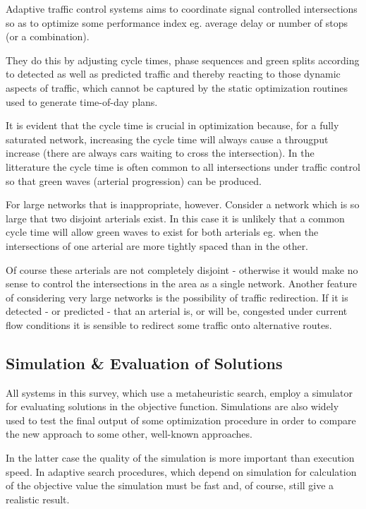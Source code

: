 \label{adaptive_cooperation}
Adaptive traffic control systems aims to coordinate signal controlled intersections so as to optimize some performance index eg. average delay or number of stops (or a combination).

They do this by adjusting cycle times, phase sequences and green splits according to detected as well as predicted traffic and thereby reacting to those dynamic aspects of traffic, which cannot be captured by the static optimization routines used to generate time-of-day plans.

It is evident that the cycle time is crucial in optimization because, for a fully saturated network, increasing the cycle time will always cause a througput increase (there are always cars waiting to cross the intersection). In the litterature the cycle time is often common to all intersections under traffic control so that green waves (arterial progression) can be produced. 

For large networks that is inappropriate, however. Consider a network which is so large that two disjoint arterials exist. In this case it is unlikely that a common cycle time will allow green waves to exist for both arterials eg. when the intersections of one arterial are more tightly spaced than in the other.

Of course these arterials are not completely disjoint - otherwise it would make no sense to control the intersections in the area as  a single network. Another feature of considering very large networks is the possibility of traffic redirection. If it is detected - or predicted - that an arterial is, or will be, congested under current flow conditions it is sensible to redirect some traffic onto alternative routes. 

\subsection{Simulation \& Evaluation of Solutions}
All systems in this survey, which use a metaheuristic search, employ a simulator for evaluating solutions in the objective function. Simulations are also widely used to test the final output of some optimization procedure in order to compare the new approach to some other, well-known approaches. 

In the latter case the quality of the simulation is more important than execution speed. In adaptive search procedures, which depend on simulation for calculation of the objective value the simulation must be fast and, of course, still give a realistic result. 

